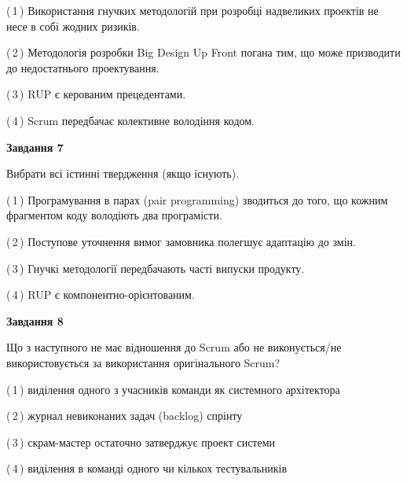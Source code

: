 \documentclass[10pt, ukrainian]{article}
\begin{document}
{\begin {large}
(\,1\,) Використання гнучких методологій при розробці надвеликих проектів не несе в собі жодних ризиків. %



(\,2\,) Методологія розробки Big Design Up Front погана тим, що може призводити до недостатнього проектування.%



(\,3\,) RUP є керованим прецедентами. %



(\,4\,) Scrum передбачає колективне володіння кодом. %


{\begin {center}\textbf{Завдання 7}\end {center}}\par
Вибрати всі істинні твердження (якщо існують).\par
\vspace{2mm}



(\,1\,) Програмування в парах (pair programming) зводиться до того, що кожним фрагментом коду володіють два програмісти. %



(\,2\,) Поступове уточнення вимог замовника полегшує адаптацію до змін. %



(\,3\,) Гнучкі методології передбачають часті випуски продукту. %



(\,4\,) RUP є компонентно-орієнтованим. %


{\begin {center}\textbf{Завдання 8}\end {center}}\par
Що з наступного не має відношення до Scrum або не виконується/не використовується за використання оригінального Scrum?\par
\vspace{2mm}



(\,1\,) виділення одного з учасників команди як системного архітектора%



(\,2\,) журнал невиконаних задач (backlog) спрінту%



(\,3\,) скрам-мастер остаточно затверджує проект системи%



(\,4\,) виділення в команді одного чи кількох тестувальників%



\end{large}}
\end{document}
